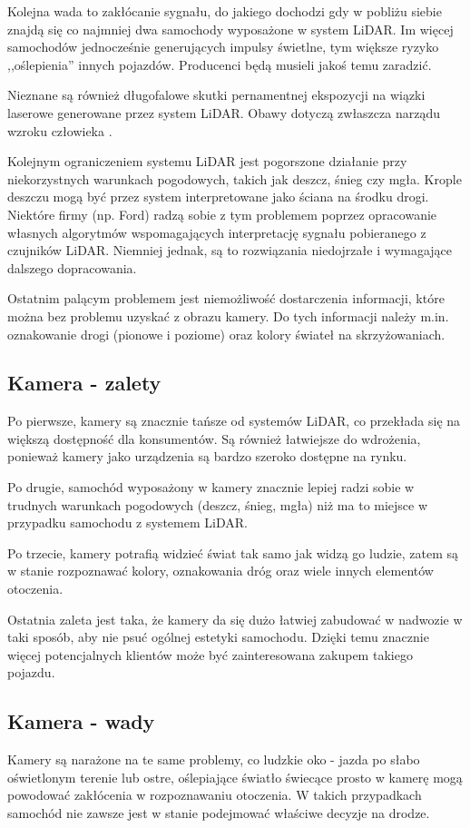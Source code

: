 Kolejna wada to zakłócanie sygnału, do jakiego dochodzi gdy w pobliżu siebie znajdą się co najmniej dwa samochody wyposażone w system LiDAR. Im więcej samochodów jednocześnie generujących impulsy świetlne, tym większe ryzyko ,,oślepienia'' innych pojazdów. Producenci będą musieli jakoś temu zaradzić.

Nieznane są również długofalowe skutki pernamentnej ekspozycji na wiązki laserowe generowane przez system LiDAR. Obawy dotyczą zwłaszcza narządu wzroku człowieka \cite{armenta:lidarSafety, thomasAko:lidarSafety, hecht:lidarSafety}.

Kolejnym ograniczeniem systemu LiDAR jest pogorszone działanie przy niekorzystnych warunkach pogodowych, takich jak deszcz, śnieg czy mgła. Krople deszczu mogą być przez system interpretowane jako ściana na środku drogi. Niektóre firmy (np. Ford) radzą sobie z tym problemem poprzez opracowanie własnych algorytmów wspomagających interpretację sygnału pobieranego z czujników LiDAR. Niemniej jednak, są to rozwiązania niedojrzałe i wymagające dalszego dopracowania.

Ostatnim palącym problemem jest niemożliwość dostarczenia informacji, które można bez problemu uzyskać z obrazu kamery. Do tych informacji należy m.in. oznakowanie drogi (pionowe i poziome) oraz kolory świateł na skrzyżowaniach.

\subsection{Kamera - zalety}
Po pierwsze, kamery są znacznie tańsze od systemów LiDAR, co przekłada się na większą dostępność dla konsumentów. Są również łatwiejsze do wdrożenia, ponieważ kamery jako urządzenia są bardzo szeroko dostępne na rynku.

Po drugie, samochód wyposażony w kamery znacznie lepiej radzi sobie w trudnych warunkach pogodowych (deszcz, śnieg, mgła) niż ma to miejsce w przypadku samochodu z systemem LiDAR.

Po trzecie, kamery potrafią widzieć świat tak samo jak widzą go ludzie, zatem są w stanie rozpoznawać kolory, oznakowania dróg oraz wiele innych elementów otoczenia.

Ostatnia zaleta jest taka, że kamery da się dużo łatwiej zabudować w nadwozie w taki sposób, aby nie psuć ogólnej estetyki samochodu. Dzięki temu znacznie więcej potencjalnych klientów może być zainteresowana zakupem takiego pojazdu.

\subsection{Kamera - wady}
Kamery są narażone na te same problemy, co ludzkie oko - jazda po słabo oświetlonym terenie lub ostre, oślepiające światło świecące prosto w kamerę mogą powodować zakłócenia w rozpoznawaniu otoczenia. W takich przypadkach samochód nie zawsze jest w stanie podejmować właściwe decyzje na drodze.


